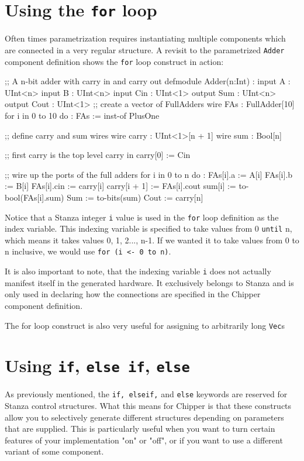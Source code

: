 \section{Using the {\tt for} loop}

Often times parametrization requires instantiating multiple components which are connected in a very regular structure. A revisit to the parametrized \verb+Adder+ component definition shows the \verb+for+ loop construct in action:

\begin{stanza}
;; A n-bit adder with carry in and carry out
defmodule Adder(n:Int) :
  input A     : UInt<n>
  input B     : UInt<n>
  input Cin   : UInt<1>
  output Sum  : UInt<n>
  output Cout : UInt<1>
  ;; create a vector of FullAdders
  wire FAs : FullAdder[10]
  for i in 0 to 10 do :
    FAs := inst-of PlusOne

  ;; define carry and sum wires
  wire carry : UInt<1>[n + 1]
  wire sum   : Bool[n]

  ;; first carry is the top level carry in
  carry[0] := Cin

  ;; wire up the ports of the full adders
  for i in 0 to n do :
     FAs[i].a     := A[i]
     FAs[i].b     := B[i]
     FAs[i].cin   := carry[i]
     carry[i + 1] := FAs[i].cout
     sum[i]       := to-bool(FAs[i].sum)
  Sum  := to-bits(sum)
  Cout := carry[n]
\end{stanza}

Notice that a Stanza integer \verb+i+ value is used in the \verb+for+ loop definition as the index variable. This indexing variable is specified to take values from 0 \verb+until+ n, which means it takes values 0, 1, 2..., n-1. If we wanted it to take values from 0 to n inclusive, we would use \verb+for (i <- 0 to n)+.

It is also important to note, that the indexing variable \verb+i+ does not actually manifest itself in the generated hardware. It exclusively belongs to Stanza and is only used in declaring how the connections are specified in the Chipper component definition.

The for loop construct is also very useful for assigning to arbitrarily long \verb+Vec+s 

\section{Using {\tt if}, {\tt else if}, {\tt else}}

As previously mentioned, the \verb+if, elseif,+ and \verb+else+ keywords are reserved for Stanza control structures. What this means for Chipper is that these constructs allow you to selectively generate different structures depending on parameters that are supplied. This is particularly useful when you want to turn certain features of your implementation "on" or "off", or if you want to use a different variant of some component.

